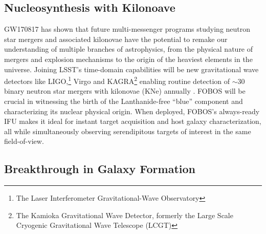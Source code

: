 \documentclass[oneside,11pt]{amsart}
\newcommand{\lam}{\lambda}
\DeclareRobustCommand{\lesssim}{%
\mathrel{\hskip-.5em\begin{array}{c}<\\[-8pt]\sim\end{array}\hskip-.5em}}
\begin{document}
\subsection{Nucleosynthesis with Kilonoave} 
\label{sec:kilonovae}

GW170817 has shown that future multi-messenger programs studying neutron star mergers and associated kilonovae have the potential to remake our understanding of multiple branches of astrophysics, from the physical nature of mergers and explosion mechanisms to the origin of the heaviest elements in the universe.  Joining LSST's time-domain capabilities will be new gravitational wave detectors like LIGO,\footnote{The Laser Interferometer Gravitational-Wave Observatory} Virgo and KAGRA\footnote{The Kamioka Gravitational Wave Detector, formerly the Large Scale Cryogenic Gravitational Wave Telescope (LCGT)} enabling routine detection of $\sim$30 binary neutron star mergers with kilonovae (KNe) annually \citep{abbott2018prospects}.  FOBOS will be crucial in witnessing the birth of the Lanthanide-free ``blue'' component and characterizing its nuclear physical origin.  When deployed, FOBOS's always-ready IFU makes it ideal for instant target acquisition and host galaxy characterization, all while simultaneously observing serendipitous targets of interest in the same field-of-view. 







\subsection{Breakthrough in Galaxy Formation} 
\label{sec:galaxies}
\end{document}
